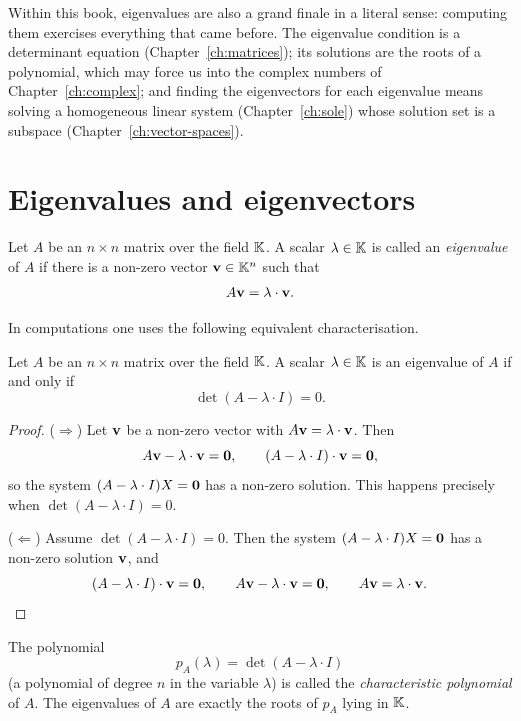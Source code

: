 Within this book, eigenvalues are also a grand finale in a literal sense: computing them exercises
everything that came before. The eigenvalue condition is a determinant equation
(Chapter~\ref{ch:matrices}); its solutions are the roots of a polynomial, which may force us into the
complex numbers of Chapter~\ref{ch:complex}; and finding the eigenvectors for each eigenvalue means
solving a homogeneous linear system (Chapter~\ref{ch:sole}) whose solution set is a subspace
(Chapter~\ref{ch:vector-spaces}).

\section{Eigenvalues and eigenvectors}

\begin{definition}
Let $A$ be an $n\times n$ matrix over the field $\mathbb{K}$. A scalar $\lambda\in \mathbb{K}$ is called an \emph{eigenvalue}
of $A$ if there is a non-zero vector $\mathbf{v}\in \mathbb{K}^n$ such that
\[
A\mathbf{v}= \lambda \cdot \mathbf{v}.
\]
\end{definition}

In computations one uses the following equivalent characterisation.

\begin{theorem}
Let $A$ be an $n\times n$ matrix over the field $\mathbb{K}$. A scalar $\lambda\in \mathbb{K}$ is an eigenvalue of $A$ if
and only if
\[
\det(A-\lambda \cdot I) = 0.
\]
\end{theorem}

\begin{proof}
($\Rightarrow$) Let $\mathbf{v}$ be a non-zero vector with $A\mathbf{v} = \lambda\cdot \mathbf{v}$. Then
\[
A\mathbf{v} - \lambda\cdot \mathbf{v} = \mathbf{0}, \qquad (A - \lambda \cdot I)\cdot \mathbf{v} = \mathbf{0},
\]
so the system $(A - \lambda \cdot I)X = \mathbf{0}$ has a non-zero solution. This happens precisely when
$\det(A - \lambda \cdot I)=0$.

($\Leftarrow$) Assume $\det(A - \lambda \cdot I)=0$. Then the system $(A - \lambda \cdot I)X = \mathbf{0}$ has a
non-zero solution $\mathbf{v}$, and
\[
(A - \lambda \cdot I)\cdot \mathbf{v} = \mathbf{0}, \qquad A\mathbf{v} - \lambda\cdot \mathbf{v} = \mathbf{0}, \qquad A\mathbf{v} = \lambda\cdot \mathbf{v}. \qedhere
\]
\end{proof}

\begin{definition}
The polynomial
\[
p_A(\lambda) = \det(A-\lambda\cdot I)
\]
(a polynomial of degree $n$ in the variable $\lambda$) is called the \emph{characteristic polynomial} of
$A$. The eigenvalues of $A$ are exactly the roots of $p_A$ lying in $\mathbb{K}$.
\end{definition}

